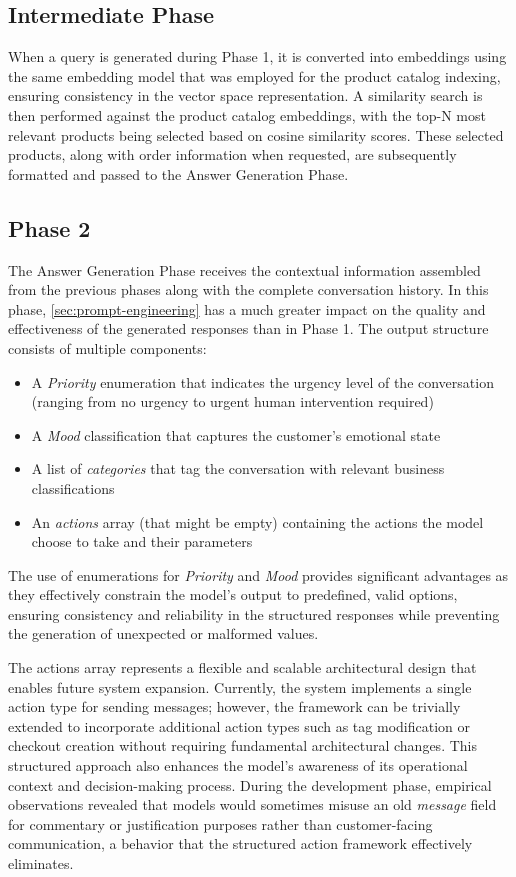 \subsection{Intermediate Phase}

When a query is generated during Phase 1, it is converted into embeddings using the same embedding model that was employed for the product catalog indexing, ensuring consistency in the vector space representation.
A similarity search is then performed against the product catalog embeddings, with the top-N most relevant products being selected based on cosine similarity scores.
These selected products, along with order information when requested, are subsequently formatted and passed to the Answer Generation Phase.

\subsection{Phase 2}

The Answer Generation Phase receives the contextual information assembled from the previous phases along with the complete conversation history.
In this phase, \cref{sec:prompt-engineering} has a much greater impact on the quality and effectiveness of the generated responses than in Phase 1.
The output structure consists of multiple components:
\begin{itemize}
    \item A \textit{Priority} enumeration that indicates the urgency level of the conversation (ranging from no urgency to urgent human intervention required)
    \item A \textit{Mood} classification that captures the customer's emotional state
    \item A list of \textit{categories} that tag the conversation with relevant business classifications
    \item An \textit{actions} array (that might be empty) containing the actions the model choose to take and their parameters
\end{itemize}
The use of enumerations for  \textit{Priority} and  \textit{Mood} provides significant advantages as they effectively constrain the model's output to predefined, valid options, ensuring consistency and reliability in the structured responses while preventing the generation of unexpected or malformed values.

The actions array represents a flexible and scalable architectural design that enables future system expansion.
Currently, the system implements a single action type for sending messages; however, the framework can be trivially extended to incorporate additional action types such as tag modification or checkout creation without requiring fundamental architectural changes.
This structured approach also enhances the model's awareness of its operational context and decision-making process.
During the development phase, empirical observations revealed that models would sometimes misuse an old \textit{message} field for commentary or justification purposes rather than customer-facing communication, a behavior that the structured action framework effectively eliminates.

